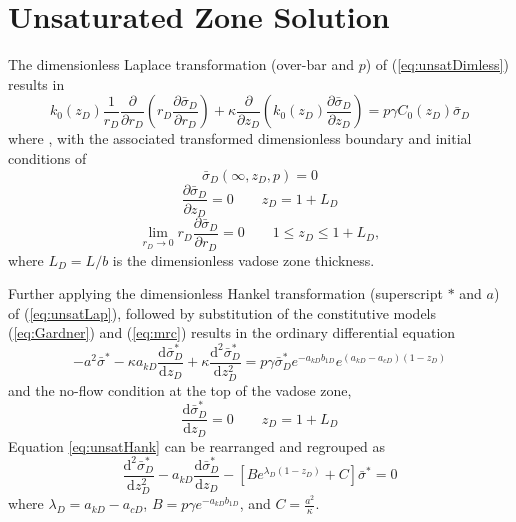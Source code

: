 \documentclass[12pt,letterpaper]{article}
\begin{document}
\section{Unsaturated Zone Solution}
The dimensionless Laplace transformation (over-bar and $p$) of (\ref{eq:unsatDimless}) results in
\begin{equation}
  \label{eq:unsatLap}
   k_0(z_D) \frac{1}{r_D} \frac{\partial}{\partial r_D} \left( r_D\frac{\partial \bar{\sigma}_D}{\partial r_D} \right) +\kappa \frac{\partial}{\partial z_D} \left( k_0(z_D) \frac{\partial \bar{\sigma}_D}{\partial z_D}\right) = p \gamma C_0(z_D)  \bar{\sigma}_D
\end{equation}
where , with the associated transformed dimensionless boundary and initial conditions of
\begin{equation}\nonumber
 \bar{\sigma}_D(\infty,z_D,p) = 0
\end{equation}
\begin{equation}\nonumber
 \frac{\partial \bar{\sigma}_D}{\partial z_D}=0 \qquad z_D=1+L_D
\end{equation}
 \begin{equation}\nonumber
\lim_{r_D \rightarrow 0} r_D \frac{\partial \bar{\sigma}_D}{\partial r_D} = 0 \qquad 1\le z_D \le 1+L_D,
\end{equation}
where $L_D = L/b$ is the dimensionless vadose zone thickness.

Further applying the dimensionless Hankel transformation (superscript $\ast$ and $a$) of (\ref{eq:unsatLap}), followed by substitution of the constitutive models (\ref{eq:Gardner}) and (\ref{eq:mrc}) results in the ordinary differential equation
\begin{equation}
  \label{eq:unsatHank}
   -a^2 \bar{\sigma}^{\ast} - \kappa a_{kD} \frac{\mathrm{d} \bar{\sigma}_D^{\ast}}{\mathrm{d} z_D} + \kappa \frac{\mathrm{d}^2 \bar{\sigma}_D^{\ast}}{\mathrm{d} z_D^2}  = p \gamma \bar{\sigma}_D^{\ast}  e^{-a_{kD} b_{1D}}  e^{\left(a_{kD} -a_{cD} \right)\left( 1 - z_D\right)}  
\end{equation}
and the no-flow condition at the top of the vadose zone, 
\begin{equation}\nonumber
 \frac{\mathrm{d}\bar{\sigma}_D^{\ast}}{\mathrm{d}z_D}=0 \qquad z_D=1+L_D 
\end{equation}
Equation \ref{eq:unsatHank} can be rearranged and regrouped as
\begin{equation}
  \label{eq:mn-d5}
  \frac{\mathrm{d}^2 \bar{\sigma}_D^{\ast}}{\mathrm{d}z_D^2} - a_{kD} \frac{\mathrm{d} \bar{\sigma}_D^{\ast}}{\mathrm{d}z_D} - \left[ B e^{\lambda_D (1-z_D)} + C\right] \bar{\sigma}^{\ast}=0
\end{equation}
where $\lambda_D = a_{kD} - a_{cD}$, $B = p\gamma e^{-a_{kD} b_{1D}}$, and $C=\frac{a^2}{\kappa}$.
\end{document}
